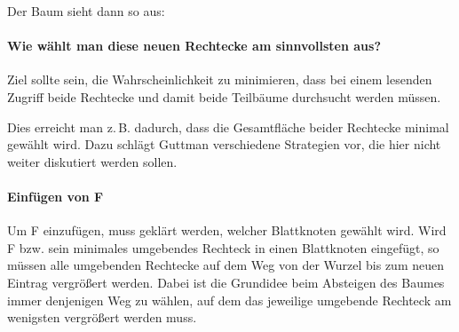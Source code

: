 \begin{enumerate}[a)]
\begin{solution}
\begin{center}
\begin{tikzpicture}
			\end{tikzpicture}
		\end{center}

		Der Baum sieht dann so aus:
		\begin{center}
		\end{center}


		\paragraph{Wie wählt man diese neuen Rechtecke am sinnvollsten aus?}

		Ziel sollte sein, die Wahrscheinlichkeit zu minimieren, dass bei einem lesenden Zugriff beide Rechtecke und damit beide Teilbäume durchsucht werden müssen.

		Dies erreicht man z.\,B. dadurch, dass die Gesamtfläche beider Rechtecke minimal gewählt wird.
		Dazu schlägt Guttman verschiedene Strategien vor, die hier nicht weiter diskutiert werden sollen.

		\paragraph{Einfügen von F}

		Um F einzufügen, muss geklärt werden, welcher Blattknoten gewählt wird.
		Wird F bzw. sein minimales umgebendes Rechteck in einen Blattknoten eingefügt, so müssen alle umgebenden Rechtecke auf dem Weg von der Wurzel bis zum neuen Eintrag vergrößert werden.
		Dabei ist die Grundidee beim Absteigen des Baumes immer denjenigen Weg zu wählen, auf dem das jeweilige umgebende Rechteck am wenigsten vergrößert werden muss.


\end{solution}
\end{enumerate}
